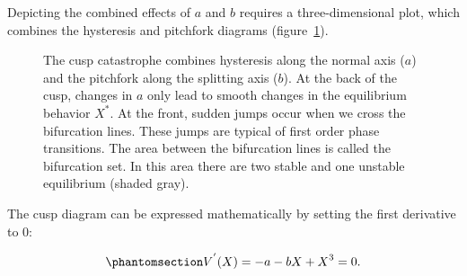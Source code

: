 \documentclass[
  a4paper,
  DIV=11,
  numbers=noendperiod,
  oneside]{scrreprt}
\begin{document}
Depicting the combined effects of \(a\) and \(b\) requires a
three-dimensional plot, which combines the hysteresis and pitchfork
diagrams (figure~\ref{fig-ch3-img10-old-22}).

\begin{figure}


\caption{\label{fig-ch3-img10-old-22}The cusp catastrophe combines
hysteresis along the normal axis (\(a\)) and the pitchfork along the
splitting axis (\(b\)). At the back of the cusp, changes in \(a\) only
lead to smooth changes in the equilibrium behavior \(X^{*}\). At the
front, sudden jumps occur when we cross the bifurcation lines. These
jumps are typical of first order phase transitions. The area between the
bifurcation lines is called the bifurcation set. In this area there are
two stable and one unstable equilibrium (shaded gray).}

\end{figure}%

The cusp diagram can be expressed mathematically by setting the first
derivative to 0:

\begin{equation}\phantomsection\label{eq-ch3-5-old-9}{
V^{'}(X) = {- a - bX + X}^{3} = 0.
}\end{equation}
\end{document}
